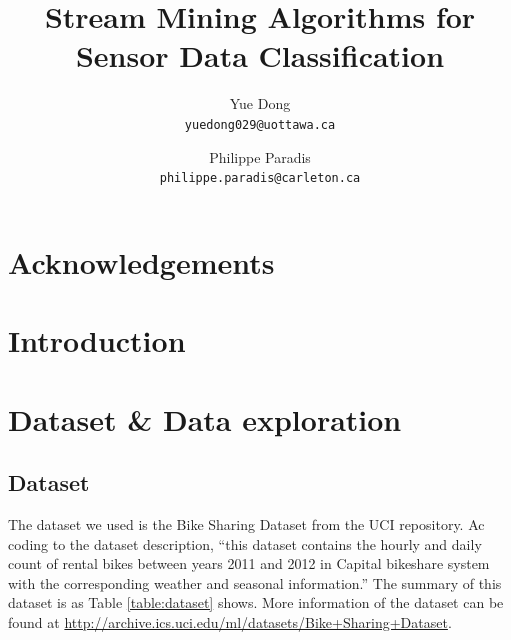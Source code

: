 \documentclass[12pt]{article}
\title{Stream Mining Algorithms for Sensor Data Classification}
\author{
    Yue Dong\\
	\texttt{yuedong029@uottawa.ca}
	\and
	Philippe Paradis\\
	\texttt{philippe.paradis@carleton.ca}
}
\begin{document}
\singlespace
\maketitle

\tableofcontents
\newpage
\section*{Acknowledgements}


\begin{abstract}                %


\end{abstract}

\setcounter{secnumdepth}{4}

\section{Introduction}
\label{sec:introduction}

\section{Dataset \& Data exploration}
\subsection{Dataset}
The dataset we used is the Bike Sharing Dataset from the UCI repository. Ac coding to the dataset description, ``this dataset contains the hourly and daily count of rental bikes between years 2011 and 2012 in Capital bikeshare system with the corresponding weather and seasonal information.''
 The summary of this dataset is as Table \ref{table:dataset} shows. More information of the dataset can be found at \url{http://archive.ics.uci.edu/ml/datasets/Bike+Sharing+Dataset}.
 
\end{document}
